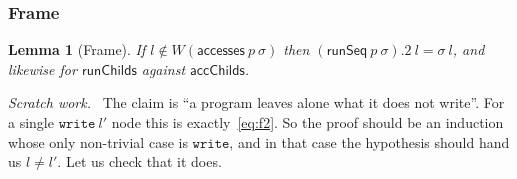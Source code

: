 \documentclass[11pt,a4paper]{article}
\theoremstyle{definition}
\theoremstyle{plain}
\newtheorem{lemma}[definition]{Lemma}
\theoremstyle{remark}
\newenvironment{scratch}{\par\medskip\noindent\textit{Scratch work.}\ \ignorespaces}{\par\medskip}
\newcommand{\st}{\sigma}
\newcommand{\writes}[1]{W(#1)}
\newcommand{\acc}{\mathsf{accesses}}
\newcommand{\runSeq}{\mathsf{runSeq}}
\begin{document}
\subsubsection{Frame}

\begin{lemma}[Frame]\label{lem:frame}
If $l \notin \writes{\acc\ p\ \st}$ then $(\runSeq\ p\ \st).2\ l = \st\ l$, and likewise for
$\mathsf{runChilds}$ against $\mathsf{accChilds}$.
\end{lemma}

\begin{scratch}
The claim is ``a program leaves alone what it does not write''. For a single
$\texttt{write}\ l'$ node this is exactly~\eqref{eq:f2}. So the proof should be an induction
whose only non-trivial case is $\texttt{write}$, and in that case the hypothesis should hand
us $l \neq l'$. Let us check that it does.
\end{scratch}
\end{document}

